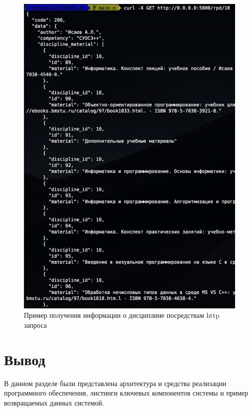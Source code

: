 \begin{figure}[h!]
	\begin{center}
		\includegraphics[scale=0.6]{img/get_example.jpg}
	\end{center}
	\captionsetup{justification=centering}
	\caption{Пример получения информации о дисциплине посредствам http запроса}
	\label{img:get-example}
\end{figure}

\newpage

\section*{Вывод}

В данном разделе были представлена архитектура и средства реализации программного обеспечения, листинги ключевых компонентов системы и пример возвращаемых данных системой.